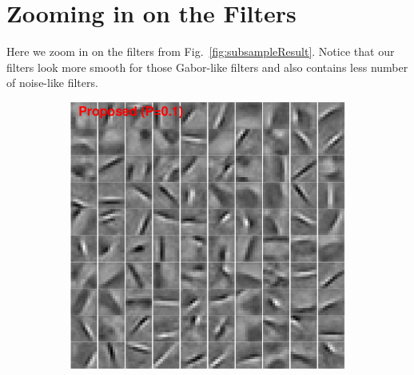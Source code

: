 
\section{Zooming in on the Filters}

Here we zoom in on the filters from Fig.\ \ref{fig:subsampleResult}. Notice that our filters look more smooth for those Gabor-like filters and also contains less number of noise-like filters.

\begin{figure}[h]
\centering
\begin{subfigure}{0.49\textwidth}
  \includegraphics[width=1\linewidth]{figure/batchFruit100.pdf}
\end{subfigure}
\begin{subfigure}{0.49\textwidth}

\end{subfigure}
\end{figure}
